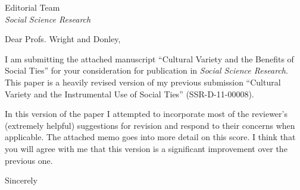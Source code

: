 \documentclass[a4paper,12pt]{letter}
\begin{document}
\begin{letter}{Editorial Team \\ \emph{Social Science Research}}

\opening{Dear Profs. Wright and Donley,} %

I am submitting the attached manuscript ``Cultural Variety and the Benefits of Social Ties'' for your consideration for publication in \emph{Social Science Research}.   This paper is a heavily revised version of my previous submission  ``Cultural Variety and the Instrumental Use of Social Ties'' (SSR-D-11-00008).  

In this version of the paper I attempted to incorporate most of the reviewer's (extremely helpful) suggestions for revision and respond to their concerns when applicable.  The attached memo goes into more detail on this score.  I think that you will agree with me that this version is a significant improvement over the previous one.


\closing{Sincerely} %


\end{letter}
\end{document}
